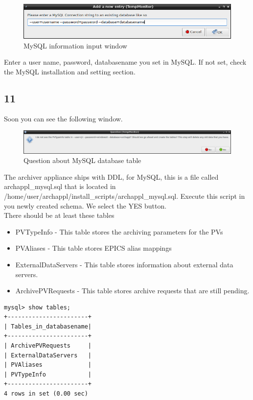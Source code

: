 \documentclass[11pt
  , a4paper
  , article
  , oneside
]{memoir}
\begin{document}
\begin{figure}[h!]
	\centering
	\includegraphics[width=1\textwidth, height=0.2\textwidth]{./images/5.png}
	\caption{MySQL information input window}
\end{figure}

Enter a user name, password, databasename you set in MySQL. If not set, check the MySQL installation and setting section.
\subsection{11}
Soon you can see the following window.

\begin{figure}[h!]
	\centering
	\includegraphics[width=1\textwidth, height=0.2\textwidth]{./images/6.png}
	\caption{Question about MySQL database table}
\end{figure}

The archiver appliance ships with DDL, for MySQL, this is a file called archappl\_mysql.sql that is located in  /home/user/archappl/install\_scripts/archappl\_mysql.sql.  Execute this script in you newly created schema. We select the YES button.\\
There should be at least these tables
\begin{itemize}
	\item PVTypeInfo - This table stores the archiving parameters for the PVs
	\item PVAliases - This table stores EPICS alias mappings
	\item ExternalDataServers - This table stores information about external data servers.
	\item ArchivePVRequests - This table stores archive requests that are still pending.
\end{itemize}
\begin{lstlisting}[style=termstyle]
mysql> show tables;
+-----------------------+
| Tables_in_databasename|
+-----------------------+
| ArchivePVRequests     |
| ExternalDataServers   |
| PVAliases             |
| PVTypeInfo            |
+-----------------------+
4 rows in set (0.00 sec)
\end{lstlisting}
\end{document}
